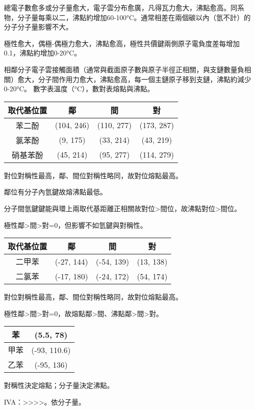 \documentclass[a4paper,12pt]{report}
\begin{document}
\item 總電子數愈多或分子量愈大，電子雲分布愈廣，凡得瓦力愈大，沸點愈高。同系物，分子量每乘以二，沸點約增加60-100°C。通常相差在兩個碳以內（氫不計）的分子分子量影響不大。
\item 極性愈大，偶極-偶極力愈大，沸點愈高，極性共價鍵兩側原子電負度差每增加0.1，沸點約增加0-20°C。
\item 相鄰分子電子雲接觸面積（通常與截面原子數與原子半徑正相關，與支鏈數量負相關）愈大，分子間作用力愈大，沸點愈高，每一個主鏈原子移到支鏈，沸點約減少0-20°C。
\eit
{}
數字表溫度（°C），數對表熔點與沸點。
\begin{longtable}[c]{|c|c|c|c|}
\hline
取代基位置 & 鄰 & 間 & 對\\\hline
苯二酚 & (104, 246) & (110, 277) & (173, 287)\\\hline
氯苯酚 & (9, 175) & (33, 214) & (43, 219)\\\hline
硝基苯酚 & (45, 214) & (95, 277) & (114, 279)\\\hline
\end{longtable}\FB
\bit
\item 對位對稱性最高，鄰、間位對稱性略同，故對位熔點最高。
\item 鄰位有分子內氫鍵故熔沸點最低。
\item 分子間氫鍵鍵能與環上兩取代基距離正相關故對位>間位，故沸點對位>間位。
\item 極性鄰>間>對=0，但影響不如氫鍵與對稱性。
\eit
{}
\begin{longtable}[c]{|c|c|c|c|}
\hline
取代基位置 & 鄰 & 間 & 對\\\hline
二甲苯 & (-27, 144) & (-54, 139) & (13, 138)\\\hline
二氯苯 & (-17, 180) & (-24, 172) & (54, 174)\\\hline
\end{longtable}\FB
\bit
\item 對位對稱性最高，鄰、間位對稱性略同，故對位熔點最高。
\item 極性鄰>間>對=0，故熔點鄰>間、沸點鄰>間>對。
\eit
{}
\begin{longtable}[c]{|c|c|}
\hline
苯 & (5.5, 78)\\\hline
甲苯 & (-93, 110.6)\\\hline
乙苯 & (-95, 136)\\\hline
\end{longtable}\FB
對稱性決定熔點；分子量決定沸點。
\bit
\item IVA：>>>>。依分子量。
\end{document}
